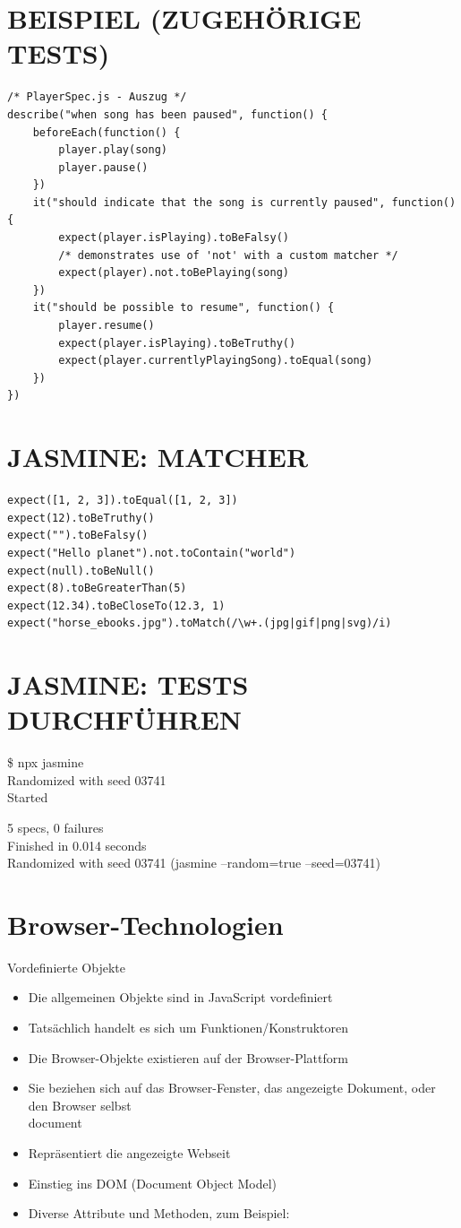 \documentclass[10pt]{article}
\begin{document}
\section*{BEISPIEL (ZUGEHÖRIGE TESTS)}
\begin{verbatim}
/* PlayerSpec.js - Auszug */
describe("when song has been paused", function() {
    beforeEach(function() {
        player.play(song)
        player.pause()
    })
    it("should indicate that the song is currently paused", function() {
        expect(player.isPlaying).toBeFalsy()
        /* demonstrates use of 'not' with a custom matcher */
        expect(player).not.toBePlaying(song)
    })
    it("should be possible to resume", function() {
        player.resume()
        expect(player.isPlaying).toBeTruthy()
        expect(player.currentlyPlayingSong).toEqual(song)
    })
})
\end{verbatim}

\section*{JASMINE: MATCHER}
\begin{verbatim}
expect([1, 2, 3]).toEqual([1, 2, 3])
expect(12).toBeTruthy()
expect("").toBeFalsy()
expect("Hello planet").not.toContain("world")
expect(null).toBeNull()
expect(8).toBeGreaterThan(5)
expect(12.34).toBeCloseTo(12.3, 1)
expect("horse_ebooks.jpg").toMatch(/\w+.(jpg|gif|png|svg)/i)
\end{verbatim}

\section*{JASMINE: TESTS DURCHFÜHREN}
\$ npx jasmine\\
Randomized with seed 03741\\
Started

5 specs, 0 failures\\
Finished in 0.014 seconds\\
Randomized with seed 03741 (jasmine --random=true --seed=03741)

\section*{Browser-Technologien}
Vordefinierte Objekte

\begin{itemize}
  \item Die allgemeinen Objekte sind in JavaScript vordefiniert
  \item Tatsächlich handelt es sich um Funktionen/Konstruktoren
  \item Die Browser-Objekte existieren auf der Browser-Plattform
  \item Sie beziehen sich auf das Browser-Fenster, das angezeigte Dokument, oder den Browser selbst\\
document
  \item Repräsentiert die angezeigte Webseit
  \item Einstieg ins DOM (Document Object Model)
  \item Diverse Attribute und Methoden, zum Beispiel:
\end{itemize}
\end{document}
